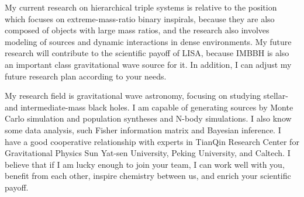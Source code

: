 \documentclass[12pt,a4paper,sans]{article}%
\begin{document}
My current research on hierarchical triple systems is relative to the position which focuses on extreme-mass-ratio binary inspirals,
because they are also composed of objects with large mass ratios, and the research also involves modeling of sources and dynamic interactions in
dense environments. My future research will contribute to the scientific payoff of LISA, because IMBBH is 
also an important class gravitational wave source for it. In addition, I can adjust my future research plan according to
your needs.

My research field is gravitational wave astronomy, focusing on studying stellar- and intermediate-mass black holes. I am
capable of generating sources by Monte Carlo simulation and population syntheses and N-body simulations. I also know
some data analysis, such Fisher information matrix and Bayesian inference. I have a good cooperative relationship with
experts in TianQin Research Center for Gravitational Physics Sun Yat-sen University, Peking University, and Caltech. I believe that if I am lucky enough to join your team, I can work well with you, benefit from each other, inspire chemistry between us, and enrich your scientific payoff. 



%
\end{document}
